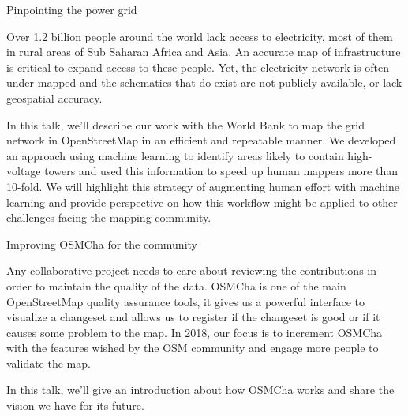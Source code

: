 
%
{Pinpointing the power grid}%
{}%
{%
  Over 1.2 billion people around the world lack access to electricity, most of them in rural areas of Sub Saharan Africa and Asia. An accurate map of infrastructure is critical to expand access to these people. Yet, the electricity network is often under-mapped and the schematics that do exist are not publicly available, or lack geospatial accuracy.

In this talk, we'll describe our work with the World Bank to map the grid network in OpenStreetMap in an efficient and repeatable manner. We developed an approach using machine learning to identify areas likely to contain high-voltage towers and used this information to speed up human mappers more than 10-fold. We will highlight this strategy of augmenting human effort with machine learning and provide perspective on how this workflow might be applied to other challenges facing the mapping community.%
}
%
{Improving OSMCha for the community}%
{}%
{%
  Any collaborative project needs to care about reviewing the contributions in order to maintain the quality of the data. OSMCha is one of the main OpenStreetMap quality assurance tools, it gives us a powerful interface to visualize a changeset and allows us to register if the changeset is good or if it causes some problem to the map. In 2018, our focus is to increment OSMCha with the features wished by the OSM community and engage more people to validate the map.

In this talk, we’ll give an introduction about how OSMCha works and share the vision we have for its future.%
}

